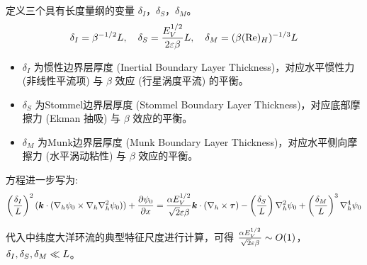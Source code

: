定义三个具有长度量纲的变量 $\delta_I$，$\delta_S$，$\delta_M$。
\begin{equation}
    \delta_I = \beta^{-1/2} L, \quad \delta_S = \frac{E_V^{1/2}}{2 \varepsilon \beta} L, \quad \delta_M = (\beta (\text{Re})_H)^{-1/3} L
    \label{eq:boundary_layer_scales}
\end{equation}

\begin{itemize}
    \item $\delta_I$ 为惯性边界层厚度 (Inertial Boundary Layer Thickness)，对应水平惯性力 (非线性平流项) 与 $\beta$ 效应 (行星涡度平流) 的平衡。
    \item $\delta_S$ 为Stommel边界层厚度 (Stommel Boundary Layer Thickness)，对应底部摩擦力 (Ekman 抽吸) 与 $\beta$ 效应的平衡。
    \item $\delta_M$ 为Munk边界层厚度 (Munk Boundary Layer Thickness)，对应水平侧向摩擦力 (水平涡动粘性) 与 $\beta$ 效应的平衡。
\end{itemize}

方程进一步写为:
\begin{equation}
    \left(\frac{\delta_I}{\hscale}\right)^2 (\kvec \cdot (\nabla_h \streamfunc_0 \times \nabla_h \nabla_h^2 \streamfunc_0)) + \pde{\streamfunc_0}{x} = \frac{\alpha \ev^{1/2}}{\sqrt{2} \ro \rossby} \kvec \cdot (\nabla_h \times \wind) - \left(\frac{\delta_S}{\hscale}\right) \nabla_h^2 \streamfunc_0 + \left(\frac{\delta_M}{\hscale}\right)^3 \nabla_h^4 \streamfunc_0
    \label{eq:sverdrup_equation}
\end{equation}

代入中纬度大洋环流的典型特征尺度进行计算，可得 $\frac{\alpha E_V^{1/2}}{\sqrt{2} \varepsilon \beta} \sim O(1)$，$\delta_I, \delta_S, \delta_M \ll L$。

